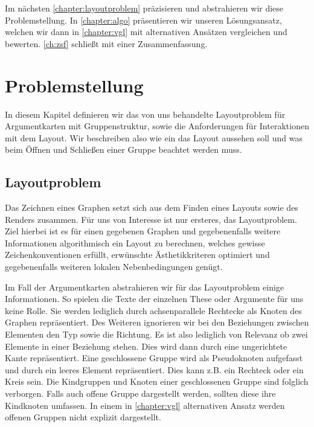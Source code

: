 Im nächsten \autoref{chapter:layoutproblem}  präzisieren und abstrahieren wir diese Problemstellung. 
In \autoref{chapter:algo} präsentieren wir unseren Lösungsansatz, welchen wir dann in \autoref{chapter:vgl} mit alternativen Ansätzen vergleichen und bewerten.
\autoref{ch:zsf} schließt mit einer Zusammenfassung.

\chapter{Problemstellung}%
\label{chapter:layoutproblem}
In diesem Kapitel definieren wir das von uns behandelte Layoutproblem für Argumentkarten mit Gruppenstruktur, sowie die Anforderungen für Interaktionen mit dem Layout.
Wir beschreiben also wie ein das Layout aussehen soll und was beim Öffnen und Schließen einer Gruppe beachtet werden muss.

\section{Layoutproblem}
\label{sec:layoutproblem}
Das Zeichnen eines Graphen setzt sich aus dem Finden eines Layouts sowie des Renders zusammen. 
Für uns von Interesse ist nur ersteres, das Layoutproblem. 
Ziel hierbei ist es für einen gegebenen Graphen und gegebenenfalls weitere Informationen algorithmisch ein Layout zu berechnen,
welches gewisse Zeichenkonventionen erfüllt, erwünschte Ästhetikkriteren optimiert und gegebenenfalls weiteren lokalen Nebenbedingungen genügt.

Im Fall der Argumentkarten abstrahieren wir für das Layoutproblem einige Informationen. 
So spielen die Texte der einzelnen These oder Argumente für uns keine Rolle. 
Sie werden lediglich durch achsenparallele Rechtecke als Knoten des Graphen repräsentiert.
Des Weiteren ignorieren wir bei den Beziehungen zwischen Elementen den Typ sowie die Richtung. 
Es ist also lediglich von Relevanz ob zwei Elemente in einer Beziehung stehen.
Dies wird dann durch eine ungerichtete Kante repräsentiert. 
Eine geschlossene Gruppe wird als Pseudoknoten aufgefasst und durch ein leeres Element repräsentiert.
Dies kann  z.B. ein Rechteck oder ein Kreis sein.  Die Kindgruppen und Knoten einer geschlossenen Gruppe sind folglich verborgen.
Falls auch offene Gruppe dargestellt werden, sollten diese ihre Kindknoten umfassen. 
In einem in \autoref{chapter:vgl} alternativen Ansatz werden offenen Gruppen nicht explizit dargestellt.

